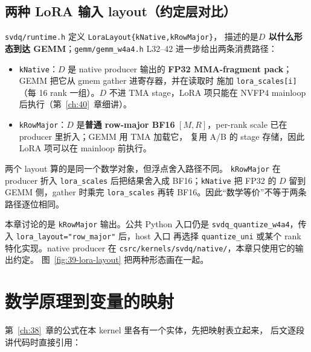 \subsection{两种 LoRA 输入 layout（约定层对比）}

\texttt{svdq/runtime.h} 定义 \texttt{LoraLayout\{kNative,kRowMajor\}}，
描述的是\textbf{$D$ 以什么形态到达 GEMM}；\texttt{gemm/gemm\_w4a4.h}
L32--42 进一步给出两条消费路径：

\begin{itemize}[itemsep=1pt,topsep=2pt]
  \item \texttt{kNative}：$D$ 是 native producer 输出的 \textbf{FP32
        MMA-fragment pack}；GEMM 把它从 gmem gather 进寄存器，并在读取时
        施加 \texttt{lora\_scales[i]}（每 16 rank 一组）。$D$ 不进 TMA
        stage，LoRA 项只能在 NVFP4 mainloop 后执行（第~\ref{ch:40}~章细讲）。
  \item \texttt{kRowMajor}：$D$ 是\textbf{普通 row-major BF16}
        $[M,R]$，per-rank scale 已在 producer 里折入；GEMM 用 TMA 加载它，
        复用 A/B 的 stage 存储，因此 LoRA 项可以在 mainloop 前执行。
\end{itemize}

两个 layout 算的是同一个数学对象，但浮点舍入路径不同。
\texttt{kRowMajor} 在 producer 折入 \texttt{lora\_scales} 后把结果舍入成
BF16；\texttt{kNative} 把 FP32 的 $D$ 留到 GEMM 侧，gather 时乘完
\texttt{lora\_scales} 再转 BF16。因此“数学等价”不等于两条路径逐位相同。

本章讨论的是 \texttt{kRowMajor} 输出。公共 Python 入口仍是
\texttt{svdq\_}\allowbreak\texttt{quantize\_}\allowbreak\texttt{w4a4}，传入
\texttt{lora\_layout=}\allowbreak\texttt{"row\_major"} 后，host 入口
再选择 \texttt{quantize\_uni} 或某个 rank 特化实现。native producer 在
\texttt{csrc/kernels/svdq/}\allowbreak\texttt{native/}，本章只使用它的输出约定。
图~\ref{fig:39-lora-layout} 把两种形态画在一起。

\section{数学原理到变量的映射}

第~\ref{ch:38}~章的公式在本 kernel 里各有一个实体，先把映射表立起来，
后文逐段讲代码时直接引用：

